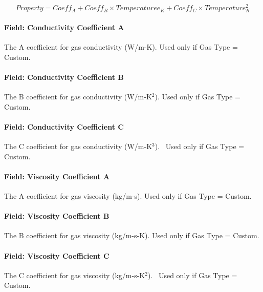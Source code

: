 \begin{equation}
Property = Coef{f_A} + Coef{f_B} \times Temperature{e_K} + Coef{f_C} \times Temperature_K^2
\end{equation}

\paragraph{Field: Conductivity Coefficient A}\label{field-conductivity-coefficient-a-1}

The A coefficient for gas conductivity (W/m-K). Used only if Gas Type = Custom.

\paragraph{Field: Conductivity Coefficient B}\label{field-conductivity-coefficient-b-1}

The B coefficient for gas conductivity (W/m-K\(^{2}\)). Used only if Gas Type = Custom.

\paragraph{Field: Conductivity Coefficient C}\label{field-conductivity-coefficient-c-1}

The C coefficient for gas conductivity (W/m-K\(^{3}\)).~ Used only if Gas Type = Custom.

\paragraph{Field: Viscosity Coefficient A}\label{field-viscosity-coefficient-a-1}

The A coefficient for gas viscosity (kg/m-s). Used only if Gas Type = Custom.

\paragraph{Field: Viscosity Coefficient B}\label{field-viscosity-coefficient-b-1}

The B coefficient for gas viscosity (kg/m-s-K). Used only if Gas Type = Custom.

\paragraph{Field: Viscosity Coefficient C}\label{field-viscosity-coefficient-c-1}

The C coefficient for gas viscosity (kg/m-s-K\(^{2}\)).~ Used only if Gas Type = Custom.

